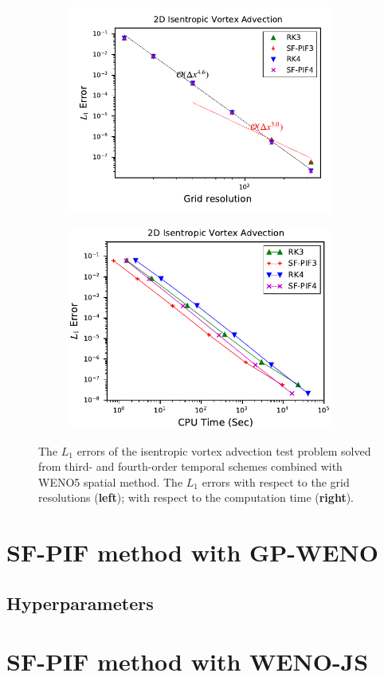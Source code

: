 \begin{figure}
    \centering
    \begin{subfigure}{70mm}
        \centering
        \includegraphics[width=0.95\textwidth]{fig/weno5_vortex_error_fourth}
    \end{subfigure}
    \begin{subfigure}{70mm}
        \centering
        \includegraphics[width=0.95\textwidth]{fig/weno5_vortex_time_fourth}
    \end{subfigure}
    \caption{The \( L_{1} \) errors of the isentropic vortex advection test problem
        solved from third- and fourth-order temporal schemes combined with WENO5 spatial method.
        The \( L_{1} \) errors
        with respect to the grid resolutions (\textbf{left});
        with respect to the computation time (\textbf{right}).
    }\label{fig:vortex_third}
\end{figure}



\section{SF-PIF method with GP-WENO}\label{sec:result_gpweno}

\subsection{Hyperparameters}\label{subsec:result_gp_hyper_params}

\section{SF-PIF method with WENO-JS}\label{sec:result_wenojs}
